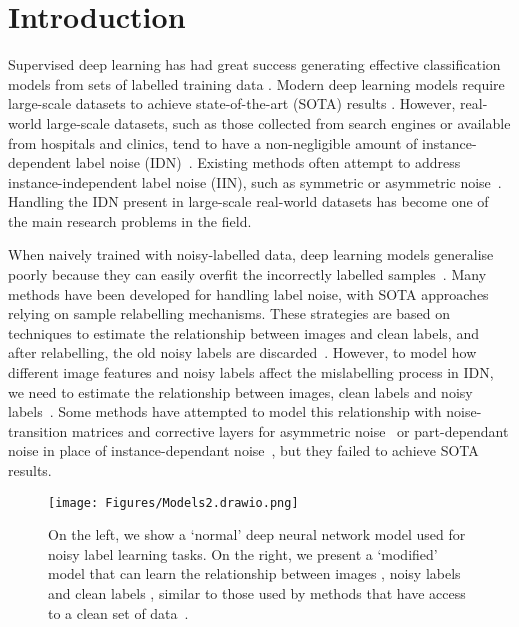 \documentclass[10pt,twocolumn,letterpaper]{article}
\begin{document}
\section{Introduction}
\label{sec:introduction}



Supervised deep learning has had great success generating effective classification models from sets of labelled training data \cite{krizhevsky2012imagenet,lecun2015deep}. 
Modern deep learning models require large-scale datasets to achieve state-of-the-art (SOTA) results \cite{pham2020meta,radford2021learning}.
However, real-world large-scale datasets, such as those collected from search engines or available from hospitals and clinics, tend to have a non-negligible amount of instance-dependent label noise (IDN)~\cite{li2017webvision, wang2017chestx}. 
Existing methods often attempt to address instance-independent label noise (IIN), such as symmetric or asymmetric noise~\cite{zhang2021learning, Goldberger2017TrainingDN, xiao2015learning}. Handling the IDN present in large-scale real-world datasets has become one of the main research problems in the field.

When naively trained with noisy-labelled data, deep learning models generalise poorly because they can easily overfit the incorrectly labelled samples~\cite{zhang2016understanding}. 
Many methods have been developed for handling label noise, with SOTA approaches relying on sample relabelling mechanisms. 
These strategies are based on techniques to estimate the relationship between images and clean labels, and after relabelling, the old noisy labels are discarded~\cite{li2020dividemix, zhang2021learning, song2019selfie}.
However, to model how different image features and noisy labels affect the mislabelling process in IDN, we need to estimate the relationship between images, clean labels and noisy labels~\cite{zhang2021learning, gu2021instancedependent}.
Some methods have attempted to model this relationship with noise-transition matrices and corrective layers for asymmetric noise~\cite{xia2019anchor, Goldberger2017TrainingDN, patrini2017making} or part-dependant noise in place of instance-dependant noise~\cite{xia2020part}, but they failed to achieve SOTA results.

\begin{figure}[t!]
    \begin{center}
    \texttt{[image: Figures/Models2.drawio.png]}
    \end{center}
    \caption{\small On the left, we show a `normal' deep neural network model used for noisy label learning tasks. On the right, we present a `modified' model that can learn the relationship between images , noisy labels  and clean labels , similar to those used by methods that have access to a clean set of data~\cite{inoue2017multi,veit2017learning,gu2021instancedependent}.}
    \label{fig:models}
\end{figure}
\end{document}
